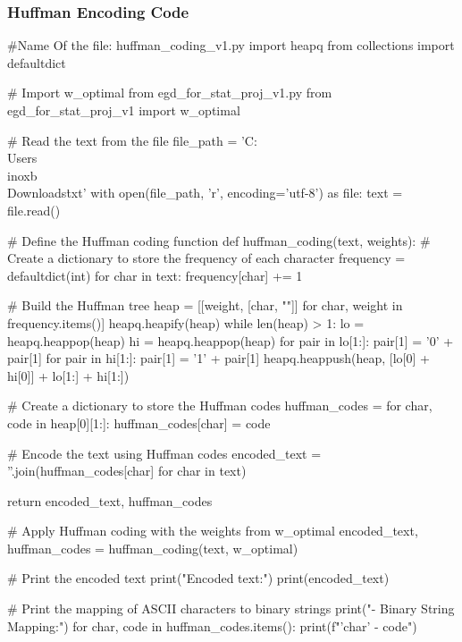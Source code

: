 \documentclass[scrartcl]{article}
\begin{document}
\subsubsection{Huffman Encoding Code}
\begin{python}
#Name Of the file: huffman_coding_v1.py
import heapq
from collections import defaultdict

# Import w_optimal from egd_for_stat_proj_v1.py
from egd_for_stat_proj_v1 import w_optimal

# Read the text from the file
file_path = 'C:\\Users\\inoxb\\Downloads\.txt'
with open(file_path, 'r', encoding='utf-8') as file:
    text = file.read()

# Define the Huffman coding function
def huffman_coding(text, weights):
    # Create a dictionary to store the frequency of each character
    frequency = defaultdict(int)
    for char in text:
        frequency[char] += 1

    # Build the Huffman tree
    heap = [[weight, [char, ""]] for char, weight in frequency.items()]
    heapq.heapify(heap)
    while len(heap) > 1:
        lo = heapq.heappop(heap)
        hi = heapq.heappop(heap)
        for pair in lo[1:]:
            pair[1] = '0' + pair[1]
        for pair in hi[1:]:
            pair[1] = '1' + pair[1]
        heapq.heappush(heap, [lo[0] + hi[0]] + lo[1:] + hi[1:])

    # Create a dictionary to store the Huffman codes
    huffman_codes = {}
    for char, code in heap[0][1:]:
        huffman_codes[char] = code

    # Encode the text using Huffman codes
    encoded_text = ''.join(huffman_codes[char] for char in text)

    return encoded_text, huffman_codes

# Apply Huffman coding with the weights from w_optimal
encoded_text, huffman_codes = huffman_coding(text, w_optimal)

# Print the encoded text
print("Encoded text:")
print(encoded_text)

# Print the mapping of ASCII characters to binary strings
print("\nCharacter - Binary String Mapping:")
for char, code in huffman_codes.items():
print(f"'{char}' - {code}")
\end{python}
\end{document}
